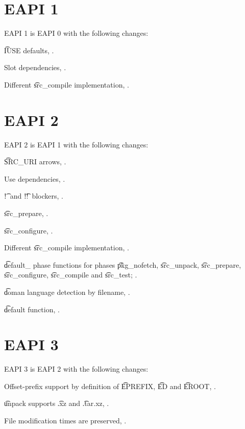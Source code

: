 \section*{EAPI 1}

EAPI 1 is EAPI 0 with the following changes:

\begin{compactitem}
\item \t{IUSE} defaults, .
\item Slot dependencies, .
\item Different \t{src_compile} implementation, .
\end{compactitem}

\section*{EAPI 2}

EAPI 2 is EAPI 1 with the following changes:

\begin{compactitem}
\item \t{SRC_URI} arrows, .
\item Use dependencies, .
\item \t{!}\ and \t{!!}\ blockers, .
\item \t{src_prepare}, .
\item \t{src_configure}, .
\item Different \t{src_compile} implementation, .
\item \t{default_} phase functions for phases \t{pkg_nofetch}, \t{src_unpack}, \t{src_prepare},
    \t{src_configure}, \t{src_compile} and \t{src_test}; .
\item \t{doman} language detection by filename, .
\item \t{default} function, .
\end{compactitem}

\section*{EAPI 3}

EAPI 3 is EAPI 2 with the following changes:
\begin{compactitem}
\item Offset-prefix support by definition of \t{EPREFIX}, \t{ED} and \t{EROOT},
    .
\item \t{unpack} supports \t{.xz} and \t{.tar.xz}, .
\item File modification times are preserved, .
\end{compactitem}

